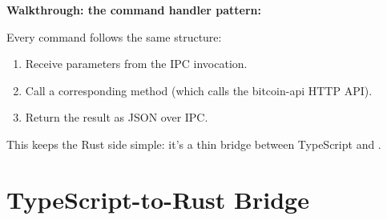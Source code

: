 \textbf{Walkthrough: the command handler pattern:}

Every command follows the same structure:

\begin{enumerate}
  \item Receive parameters from the IPC invocation.
  \item Call a corresponding  method (which calls the bitcoin-api HTTP API).
  \item Return the result as JSON over IPC.
\end{enumerate}

This keeps the Rust side simple: it's a thin bridge between TypeScript and .

\section{TypeScript-to-Rust Bridge}
\label{sec:ch17-commands-ts}

